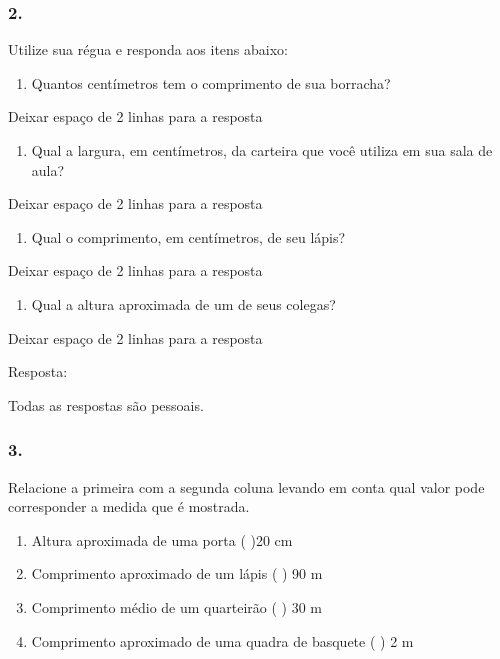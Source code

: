 \subsubsection{2.}\label{section-52}

Utilize sua régua e responda aos itens abaixo:

\begin{enumerate}
\def\labelenumi{\alph{enumi})}
\item
  Quantos centímetros tem o comprimento de sua borracha?
\end{enumerate}

Deixar espaço de 2 linhas para a resposta

\begin{enumerate}
\def\labelenumi{\alph{enumi})}
\item
  Qual a largura, em centímetros, da carteira que você utiliza em sua
  sala de aula?
\end{enumerate}

Deixar espaço de 2 linhas para a resposta

\begin{enumerate}
\def\labelenumi{\alph{enumi})}
\item
  Qual o comprimento, em centímetros, de seu lápis?
\end{enumerate}

Deixar espaço de 2 linhas para a resposta

\begin{enumerate}
\def\labelenumi{\alph{enumi})}
\item
  Qual a altura aproximada de um de seus colegas?
\end{enumerate}

Deixar espaço de 2 linhas para a resposta

Resposta:

Todas as respostas são pessoais.

\subsubsection{3.}\label{section-53}

Relacione a primeira com a segunda coluna levando em conta qual valor
pode corresponder a medida que é mostrada.

\begin{enumerate}
\def\labelenumi{(\Alph{enumi})}
\item
  Altura aproximada de uma porta ( )20 cm
\item
  Comprimento aproximado de um lápis ( ) 90 m
\item
  Comprimento médio de um quarteirão ( ) 30 m
\item
  Comprimento aproximado de uma quadra de basquete ( ) 2 m
\end{enumerate}

